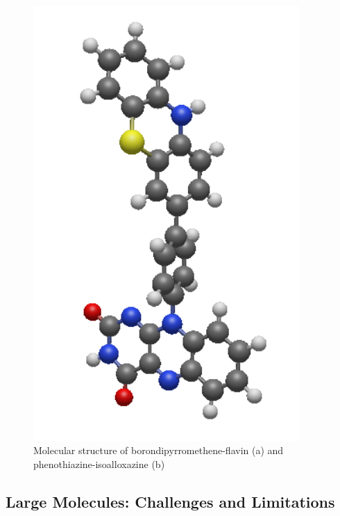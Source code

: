 \begin{figure}
\begin{minipage}{0.45\textwidth}
\includegraphics[width=0.9\textwidth]{Pics/DYAP.png}
\end{minipage}
\caption{Molecular structure of borondipyrromethene-flavin (a) and phenothiazine-isoalloxazine (b)}
\label{fig:ES_ACCMOL}
\end{figure}

\subsection{Large Molecules: Challenges and Limitations}


